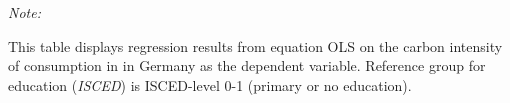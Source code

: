 \begin{table}[htbp!]
\begin{adjustbox}{width = 1\textwidth, max height = 0.95\textheight, center}
\begin{threeparttable}[b]
         \begin{tablenotes}\item \medskip \textit{Note:}
            \item This table displays regression results from equation OLS on the carbon intensity of consumption in  in Germany as the dependent variable. Reference group for education (\textit{ISCED}) is ISCED-level 0-1 (primary or no education).
         \end{tablenotes}
      \end{threeparttable}
   \end{adjustbox}
\end{table}



